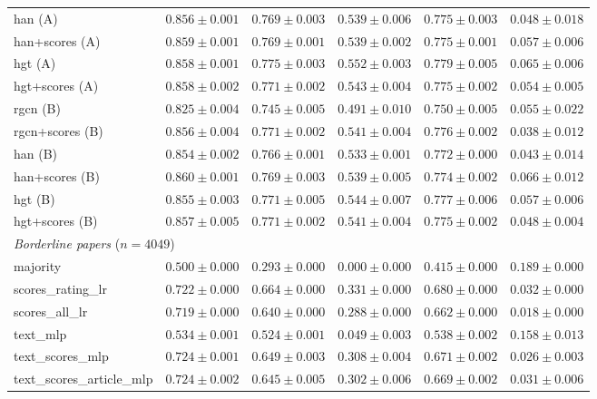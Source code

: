 \begin{table}[t]
\begin{tabular}{lccccc}
han (A) & $0.856 \pm 0.001$ & $0.769 \pm 0.003$ & $0.539 \pm 0.006$ & $0.775 \pm 0.003$ & $0.048 \pm 0.018$ \\
han+scores (A) & $0.859 \pm 0.001$ & $0.769 \pm 0.001$ & $0.539 \pm 0.002$ & $0.775 \pm 0.001$ & $0.057 \pm 0.006$ \\
hgt (A) & $0.858 \pm 0.001$ & $0.775 \pm 0.003$ & $0.552 \pm 0.003$ & $0.779 \pm 0.005$ & $0.065 \pm 0.006$ \\
hgt+scores (A) & $0.858 \pm 0.002$ & $0.771 \pm 0.002$ & $0.543 \pm 0.004$ & $0.775 \pm 0.002$ & $0.054 \pm 0.005$ \\
rgcn (B) & $0.825 \pm 0.004$ & $0.745 \pm 0.005$ & $0.491 \pm 0.010$ & $0.750 \pm 0.005$ & $0.055 \pm 0.022$ \\
rgcn+scores (B) & $0.856 \pm 0.004$ & $0.771 \pm 0.002$ & $0.541 \pm 0.004$ & $0.776 \pm 0.002$ & $0.038 \pm 0.012$ \\
han (B) & $0.854 \pm 0.002$ & $0.766 \pm 0.001$ & $0.533 \pm 0.001$ & $0.772 \pm 0.000$ & $0.043 \pm 0.014$ \\
han+scores (B) & $0.860 \pm 0.001$ & $0.769 \pm 0.003$ & $0.539 \pm 0.005$ & $0.774 \pm 0.002$ & $0.066 \pm 0.012$ \\
hgt (B) & $0.855 \pm 0.003$ & $0.771 \pm 0.005$ & $0.544 \pm 0.007$ & $0.777 \pm 0.006$ & $0.057 \pm 0.006$ \\
hgt+scores (B) & $0.857 \pm 0.005$ & $0.771 \pm 0.002$ & $0.541 \pm 0.004$ & $0.775 \pm 0.002$ & $0.048 \pm 0.004$ \\
\midrule
\multicolumn{6}{l}{\emph{Borderline papers} ($n = 4049$)} \\
majority & $0.500 \pm 0.000$ & $0.293 \pm 0.000$ & $0.000 \pm 0.000$ & $0.415 \pm 0.000$ & $0.189 \pm 0.000$ \\
scores\_rating\_lr & $0.722 \pm 0.000$ & $0.664 \pm 0.000$ & $0.331 \pm 0.000$ & $0.680 \pm 0.000$ & $0.032 \pm 0.000$ \\
scores\_all\_lr & $0.719 \pm 0.000$ & $0.640 \pm 0.000$ & $0.288 \pm 0.000$ & $0.662 \pm 0.000$ & $0.018 \pm 0.000$ \\
text\_mlp & $0.534 \pm 0.001$ & $0.524 \pm 0.001$ & $0.049 \pm 0.003$ & $0.538 \pm 0.002$ & $0.158 \pm 0.013$ \\
text\_scores\_mlp & $0.724 \pm 0.001$ & $0.649 \pm 0.003$ & $0.308 \pm 0.004$ & $0.671 \pm 0.002$ & $0.026 \pm 0.003$ \\
text\_scores\_article\_mlp & $0.724 \pm 0.002$ & $0.645 \pm 0.005$ & $0.302 \pm 0.006$ & $0.669 \pm 0.002$ & $0.031 \pm 0.006$ \\

\end{tabular}
\end{table}
